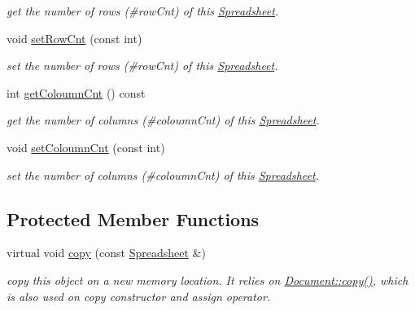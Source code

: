 \begin{DoxyCompactItemize}
\begin{DoxyCompactList}\small\item\em get the number of rows (\#row\-Cnt) of this \hyperlink{classdocs_1_1Spreadsheet}{Spreadsheet}. \end{DoxyCompactList}\item 
\hypertarget{classdocs_1_1Spreadsheet_a2178260b64460a010251eba24513bb9d}{void \hyperlink{classdocs_1_1Spreadsheet_a2178260b64460a010251eba24513bb9d}{set\-Row\-Cnt} (const int)}\label{classdocs_1_1Spreadsheet_a2178260b64460a010251eba24513bb9d}

\begin{DoxyCompactList}\small\item\em set the number of rows (\#row\-Cnt) of this \hyperlink{classdocs_1_1Spreadsheet}{Spreadsheet}. \end{DoxyCompactList}\item 
\hypertarget{classdocs_1_1Spreadsheet_a9a89463f0b79318f6ead47bb4d00a7b4}{int \hyperlink{classdocs_1_1Spreadsheet_a9a89463f0b79318f6ead47bb4d00a7b4}{get\-Coloumn\-Cnt} () const }\label{classdocs_1_1Spreadsheet_a9a89463f0b79318f6ead47bb4d00a7b4}

\begin{DoxyCompactList}\small\item\em get the number of columns (\#coloumn\-Cnt) of this \hyperlink{classdocs_1_1Spreadsheet}{Spreadsheet}. \end{DoxyCompactList}\item 
\hypertarget{classdocs_1_1Spreadsheet_a85e9d8dafdc6793560cb3f1cca41f8e2}{void \hyperlink{classdocs_1_1Spreadsheet_a85e9d8dafdc6793560cb3f1cca41f8e2}{set\-Coloumn\-Cnt} (const int)}\label{classdocs_1_1Spreadsheet_a85e9d8dafdc6793560cb3f1cca41f8e2}

\begin{DoxyCompactList}\small\item\em set the number of columns (\#coloumn\-Cnt) of this \hyperlink{classdocs_1_1Spreadsheet}{Spreadsheet}. \end{DoxyCompactList}\end{DoxyCompactItemize}
\subsection*{Protected Member Functions}
\begin{DoxyCompactItemize}
\item 
\hypertarget{classdocs_1_1Spreadsheet_ad7ab608a90b53969ec97214c447c43c6}{virtual void \hyperlink{classdocs_1_1Spreadsheet_ad7ab608a90b53969ec97214c447c43c6}{copy} (const \hyperlink{classdocs_1_1Spreadsheet}{Spreadsheet} \&)}\label{classdocs_1_1Spreadsheet_ad7ab608a90b53969ec97214c447c43c6}

\begin{DoxyCompactList}\small\item\em copy this object on a new memory location. It relies on \hyperlink{classdocs_1_1Document_ad8b6a91c7a8e39a880790d14aba14322}{Document\-::copy()}, which is also used on copy constructor and assign operator. \end{DoxyCompactList}\end{DoxyCompactItemize}
